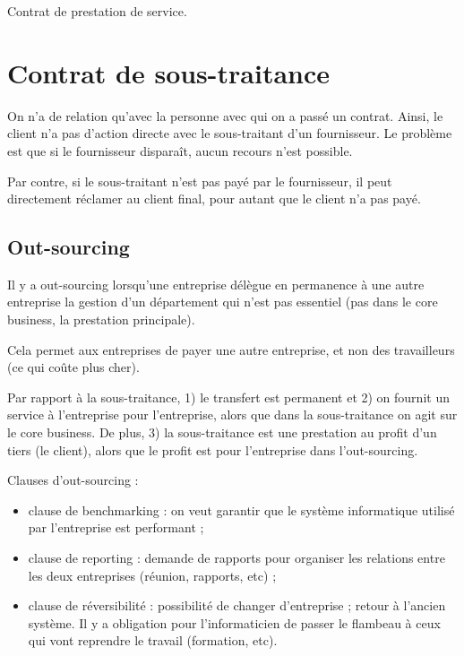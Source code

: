 	Contrat de prestation de service.
	
	
	
	\section{Contrat de sous-traitance}
	
	
		
	 On n'a de relation qu'avec la personne avec qui on a passé un contrat. Ainsi, le client n'a pas d'action directe avec le sous-traitant d'un fournisseur. Le problème est que si le fournisseur disparaît, aucun recours n'est possible.
		
	Par contre, si le sous-traitant n'est pas payé par le fournisseur, il peut directement réclamer au client final, pour autant que le client n'a pas payé.
	
		\subsection{Out-sourcing}	
		Il y a out-sourcing lorsqu'une entreprise délègue en permanence à une autre entreprise la gestion d'un département qui n'est pas essentiel (pas dans le core business, la prestation principale).		
		
		Cela permet aux entreprises de payer une autre entreprise, et non des travailleurs (ce qui coûte plus cher).	
		
		Par rapport à la sous-traitance,  1) le transfert est permanent et  2) on fournit un service à l'entreprise pour l'entreprise, alors que dans la sous-traitance on agit sur le core business. De plus, 3) la sous-traitance est une prestation au profit d'un tiers (le client), alors que le profit est pour l'entreprise dans l'out-sourcing.
		
		Clauses d'out-sourcing :
	
		\begin{itemize}
			\item clause de benchmarking : on veut garantir que le système informatique utilisé par l'entreprise est performant ;
			\item clause de reporting : demande de rapports pour organiser les relations entre les deux entreprises (réunion, rapports, etc) ;
			\item clause de réversibilité : possibilité de changer d'entreprise ; retour à l'ancien système. Il y a obligation pour l'informaticien de passer le flambeau à ceux qui vont reprendre le travail (formation, etc).
		\end{itemize}
	
	
	
	